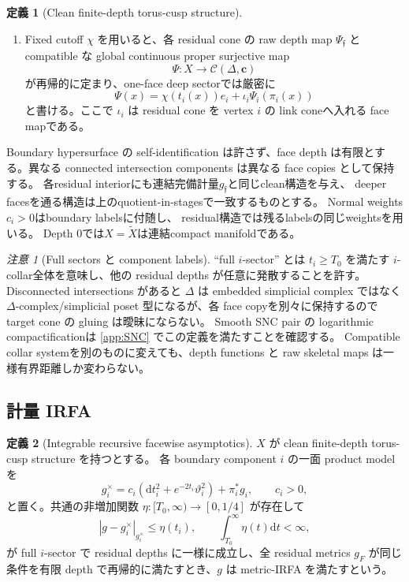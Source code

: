 \documentclass[11pt,a4paper]{ltjsarticle}
\newcommand{\dd}{\mathrm d}
\newcommand{\cC}{\mathcal C}
\newcommand{\wt}{\widetilde}
\theoremstyle{plain}
\theoremstyle{definition}
\newtheorem{definition}[definition]{定義}
\theoremstyle{remark}
\newtheorem{remark}[remark]{注意}
\begin{document}
\begin{definition}[Clean finite-depth torus-cusp structure]
\begin{enumerate}
 \item Fixed cutoff $\chi$ を用いると、各 residual cone の raw depth map $\Psi_{\mathfrak f}$ と compatible な global continuous proper surjective map
 \[
   \Psi:X\longrightarrow \cC(\Delta,\bm c)
 \]
 が再帰的に定まり、one-face deep sectorでは厳密に
 \begin{equation}
 \label{eq:clean-recursive-map}
   \Psi(x)=\chi(t_i(x))e_i+\iota_i\Psi_i(\pi_i(x))
 \end{equation}
 と書ける。ここで $\iota_i$ は residual cone を vertex $i$ の link coneへ入れる face mapである。
\end{enumerate}
Boundary hypersurface の self-identification は許さず、face depth は有限とする。異なる connected intersection components は異なる face copies として保持する。
各residual interiorにも連結完備計量$g_{\mathfrak f}$と同じclean構造を与え、
deeper facesを通る構造は上のquotient-in-stagesで一致するものとする。
Normal weights $c_i>0$はboundary labelsに付随し、
residual構造では残るlabelsの同じweightsを用いる。
Depth $0$では$X=\wt X$は連結compact manifoldである。
\end{definition}

\begin{remark}[Full sectors と component labels]
\label{rem:full-sector}
``full $i$-sector'' とは $t_i\ge T_0$ を満たす $i$-collar全体を意味し、他の residual depths が任意に発散することを許す。
Disconnected intersections があると $\Delta$ は embedded simplicial complex ではなく $\Delta$-complex/simplicial poset 型になるが、各 face copyを別々に保持するので target cone の gluing は曖昧にならない。
Smooth SNC pair の logarithmic compactificationは \cref{app:SNC} でこの定義を満たすことを確認する。
Compatible collar systemを別のものに変えても、depth functions と raw skeletal maps は一様有界距離しか変わらない。
\end{remark}

\subsection{計量 IRFA}
\begin{definition}[Integrable recursive facewise asymptotics]
\label{def:metricIRFA}
$X$ が clean finite-depth torus-cusp structure を持つとする。
各 boundary component $i$ の一面 product modelを
\[
 g_i^\times=c_i(\dd t_i^2+e^{-2t_i}\vartheta_i^2)+\pi_i^*g_i,
 \qquad c_i>0,
\]
と置く。共通の非増加関数 $\eta:[T_0,\infty)\to[0,1/4]$ が存在して
\begin{equation}
\label{eq:metricIRFA}
 |g-g_i^\times|_{g_i^\times}\le\eta(t_i),
 \qquad
 \int_{T_0}^{\infty}\eta(t)\dd t<\infty,
\end{equation}
が full $i$-sector で residual depths に一様に成立し、全 residual metrics $g_F$ が同じ条件を有限 depth で再帰的に満たすとき、$g$ は metric-IRFA を満たすという。
\end{definition}
\end{document}
